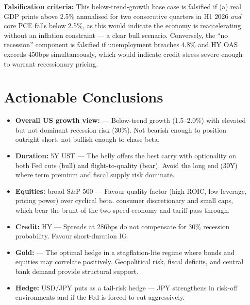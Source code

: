 \documentclass{wilson-report}
\begin{document}
\textbf{Falsification criteria:} This below-trend-growth base case is falsified if (a) real GDP prints above 2.5\% annualised for two consecutive quarters in H1 2026 \textit{and} core PCE falls below 2.5\%, as this would indicate the economy is reaccelerating without an inflation constraint --- a clear bull scenario. Conversely, the ``no recession'' component is falsified if unemployment breaches 4.8\% and HY OAS exceeds 450bps simultaneously, which would indicate credit stress severe enough to warrant recessionary pricing.

\section{Actionable Conclusions}

\begin{itemize}[leftmargin=1.2em, itemsep=4pt]
  \item \textbf{Overall US growth view:} \neutralweight{}  --- Below-trend growth (1.5--2.0\%) with elevated but not dominant recession risk (30\%). Not bearish enough to position outright short, not bullish enough to chase beta.
  \item \textbf{Duration:} \overweight{} 5Y UST  --- The belly offers the best carry with optionality on both Fed cuts (bull) and flight-to-quality (bear). Avoid the long end (30Y) where term premium and fiscal supply risk dominate.
  \item \textbf{Equities:} \neutralweight{} broad S\&P 500  --- Favour quality factor (high ROIC, low leverage, pricing power) over cyclical beta. \underweight{} consumer discretionary and small caps, which bear the brunt of the two-speed economy and tariff pass-through.
  \item \textbf{Credit:} \underweight{} HY  --- Spreads at 286bps do not compensate for 30\% recession probability. Favour short-duration IG.
  \item \textbf{Gold:} \overweight{}  --- The optimal hedge in a stagflation-lite regime where bonds and equities may correlate positively. Geopolitical risk, fiscal deficits, and central bank demand provide structural support.
  \item \textbf{Hedge:} USD/JPY puts as a tail-risk hedge --- JPY strengthens in risk-off environments and if the Fed is forced to cut aggressively.
\end{itemize}
\end{document}
